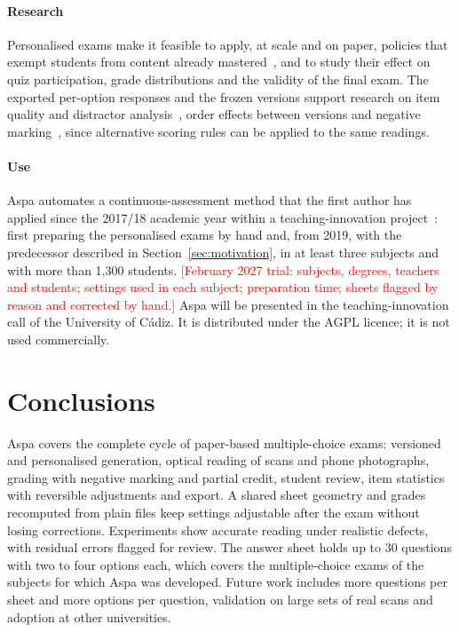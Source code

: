 \documentclass[preprint,12pt, a4paper]{elsarticle}
\newcommand{\todo}[1]{\textcolor{red}{[#1]}}
\begin{document}
\paragraph{Research} Personalised exams make it feasible to apply, at scale and on paper, policies that exempt students from content already mastered~\cite{bloom1968}, and to study their effect on quiz participation, grade distributions and the validity of the final exam. The exported per-option responses and the frozen versions support research on item quality and distractor analysis~\cite{ebel1991}, order effects between versions and negative marking~\cite{burton2005}, since alternative scoring rules can be applied to the same readings.

\paragraph{Use} Aspa automates a continuous-assessment method that the first author has applied since the 2017/18 academic year within a teaching-innovation project~\cite{gutierrez2018}: first preparing the personalised exams by hand and, from 2019, with the predecessor described in Section~\ref{sec:motivation}, in at least three subjects and with more than 1,300 students. \todo{February 2027 trial: subjects, degrees, teachers and students; settings used in each subject; preparation time; sheets flagged by reason and corrected by hand.} Aspa will be presented in the teaching-innovation call of the University of Cádiz. It is distributed under the AGPL licence; it is not used commercially.

\section{Conclusions}
\label{sec:conclusions}

Aspa covers the complete cycle of paper-based multiple-choice exams: versioned and personalised generation, optical reading of scans and phone photographs, grading with negative marking and partial credit, student review, item statistics with reversible adjustments and export. A shared sheet geometry and grades recomputed from plain files keep settings adjustable after the exam without losing corrections. Experiments show accurate reading under realistic defects, with residual errors flagged for review. The answer sheet holds up to 30 questions with two to four options each, which covers the multiple-choice exams of the subjects for which Aspa was developed. Future work includes more questions per sheet and more options per question, validation on large sets of real scans and adoption at other universities.
\end{document}
